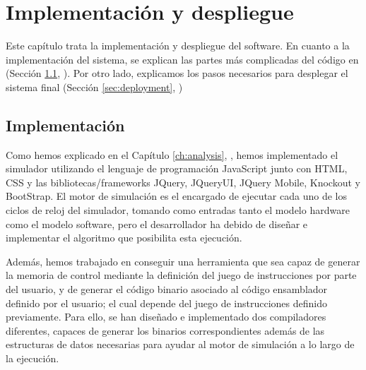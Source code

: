 \chead[]{}
\renewcommand{\headrulewidth}{0.5pt}

\lfoot[]{}
\cfoot[]{}
\rfoot[]{}
\renewcommand{\footrulewidth}{0pt}

\chapter{Implementación y despliegue}
\label{ch:implementation_and_deployment}


Este capítulo trata la implementación y despliegue del software. En cuanto a la implementación del sistema, se explican las partes más complicadas del código en (Sección  \ref{sec:implementation}, \textit{}). Por otro lado, explicamos los pasos necesarios para desplegar el sistema final (Sección \ref{sec:deployment}, \textit{})


\section{Implementación}
\label{sec:implementation}


Como hemos explicado en el Capítulo \ref{ch:analysis}, \textit{}, hemos implementado el simulador utilizando el lenguaje de programación JavaScript junto con HTML, CSS y las bibliotecas/frameworks JQuery, JQueryUI, JQuery Mobile, Knockout y BootStrap. El motor de simulación es el encargado de ejecutar cada uno de los ciclos de reloj del simulador, tomando como entradas tanto el modelo hardware como el modelo software, pero el desarrollador ha debido de diseñar e implementar el algoritmo que posibilita esta ejecución.

Además, hemos trabajado en conseguir una herramienta que sea capaz de generar la memoria de control mediante la definición del juego de instrucciones por parte del usuario, y de generar el código binario asociado al código ensamblador definido por el usuario; el cual depende del juego de instrucciones definido previamente. Para ello, se han diseñado e implementado dos compiladores diferentes, capaces de generar los binarios correspondientes además de las estructuras de datos necesarias para ayudar al motor de simulación a lo largo de la ejecución.

